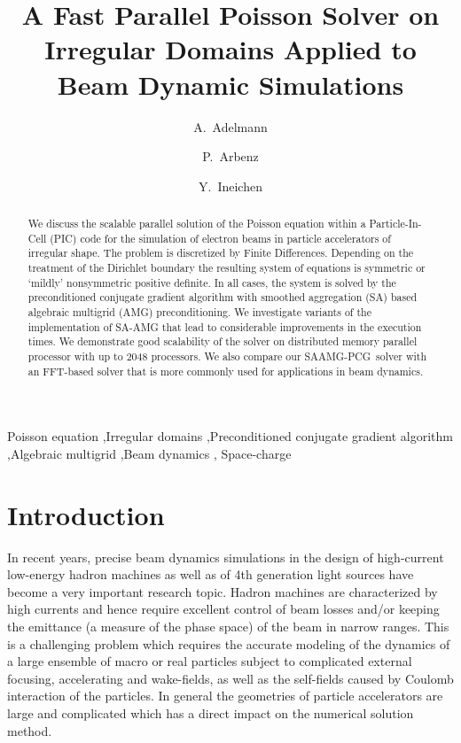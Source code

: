 \documentclass[a4paper,10pt,3p,preprint,pdftex]{elsarticle}
\title{A Fast Parallel Poisson Solver on Irregular Domains Applied to Beam
  Dynamic Simulations }
\author[psi]{A.~Adelmann\corref{cor}}
\author[eth]{P.~Arbenz}
\author[psi,eth]{Y.~Ineichen}
\newcommand{\oursolver}{\textsc{SAAMG-PCG}}
\begin{document}
\begin{keyword}
  Poisson equation \sep Irregular domains \sep Preconditioned conjugate
  gradient algorithm \sep Algebraic multigrid \sep Beam dynamics \sep
  Space-charge
\end{keyword}

\begin{abstract}
  We discuss the scalable parallel solution of the Poisson equation
  within a Particle-In-Cell (PIC) code for the simulation of electron
  beams in particle accelerators of irregular shape.  The problem is
  discretized by Finite Differences.  Depending on the treatment of the
  Dirichlet boundary the resulting system of equations is symmetric or
  `mildly' nonsymmetric positive definite.  In all cases, the system is
  solved by the preconditioned conjugate gradient algorithm with
  smoothed aggregation (SA) based algebraic multigrid (AMG)
  preconditioning.  We investigate variants of the implementation of
  SA-AMG that lead to considerable improvements in the execution times.
  We demonstrate good scalability of the solver on distributed memory
  parallel processor with up to 2048 processors.  We also compare our
  \oursolver\ solver with an FFT-based solver that is more commonly used
  for applications in beam dynamics.
\end{abstract}

\maketitle

\nocite{*}

%
\section{Introduction}
\label{sec:intro}

In recent years, precise beam dynamics simulations in the design of
high-current low-energy hadron machines as well as of 4th generation
light sources have become a very important research topic.  Hadron
machines are characterized by high currents and hence require excellent
control of beam losses and/or keeping the emittance (a measure of the
phase space) of the beam in narrow ranges.  This is a challenging
problem which requires the accurate modeling of the dynamics of a large
ensemble of macro or real particles subject to complicated external
focusing, accelerating and wake-fields, as well as the self-fields
caused by Coulomb interaction of the particles.  In general the
geometries of particle accelerators are large and complicated which has
a direct impact on the numerical solution method.
\end{document}
